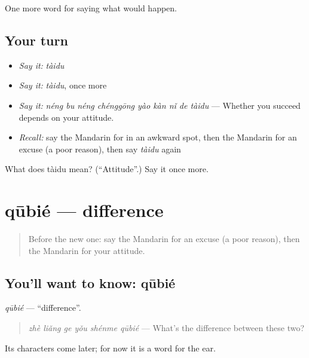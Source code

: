 \begin{grammarlens}[title={What you've built}]
One more word for saying what would happen.
\end{grammarlens}

\subsection*{Your turn}
\begin{itemize}
\raggedright
  \item \emph{Say it:} \emph{tàidu}
  \item \emph{Say it:} \emph{tàidu}, once more
  \item \emph{Say it:} \emph{néng bu néng chénggōng yào kàn nǐ de tàidu} — Whether you succeed depends on your attitude.
  \item \emph{Recall:} say the Mandarin for in an awkward spot, then the Mandarin for an excuse (a poor reason), then say \emph{tàidu} again
\end{itemize}

\begin{tcolorbox}[breakable,colback=teal!4,colframe=teal!35!black,title={Before you move on}]
What does tàidu mean? (\textquotedblleft{}Attitude\textquotedblright{}.) Say it once more.
\end{tcolorbox}
\section[qūbié]{qūbié — difference}

\label{lesson:ZH-C398-qubie}



\begin{quote}
Before the new one: say the Mandarin for an excuse (a poor reason), then the Mandarin for your attitude.
\end{quote}

\subsection*{You'll want to know: qūbié}
\emph{qūbié} — \textquotedblleft{}difference\textquotedblright{}.

\begin{quote}
\emph{zhè liǎng ge yǒu shénme qūbié} — What's the difference between these two?
\end{quote}

Its characters come later; for now it is a word for the ear.

